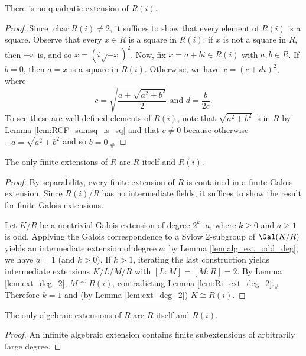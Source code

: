 \begin{lemma}
  \label{lem:Ri_ext_deg_2}
  \leanok
  There is no quadratic extension of $R(i)$.
\end{lemma}
\begin{proof}
  \leanok
  Since $\operatorname{char}R(i)\neq 2$, it suffices to show that every element of $R(i)$ is a square. Observe that every $x\in R$ is a square in $R(i)$: if $x$ is not a square in $R$, then $-x$ is, and so $x=(i\sqrt{-x})^2$. Now, fix $x=a+bi\in R(i)$ with $a,b\in R$. If $b=0$, then $a=x$ is a square in $R(i)$. Otherwise, we have $x=(c+di)^2$, where
  \[c=\sqrt{\frac{a+\sqrt{a^2+b^2}}{2}}\text{ and }d=\frac{b}{2c}.\]
  To see these are well-defined elements of $R(i)$, note that $\sqrt{a^2+b^2}$ is in $R$ by Lemma \ref{lem:RCF_sumsq_is_sq} and that $c\neq0$ because otherwise $-a=\sqrt{a^2+b^2}$ and so $b=0$.$_\#$
\end{proof}

\begin{theorem}
  \label{thm:FTAlg}
  \leanok
  The only finite extensions of $R$ are $R$ itself and $R(i)$.
\end{theorem}
\begin{proof}
  \leanok
  By separability, every finite extension of $R$ is contained in a finite Galois extension. Since $R(i)/R$ has no intermediate fields, it suffices to show the result for finite Galois extensions.
  
  Let $K/R$ be a nontrivial Galois extension of degree $2^k\cdot a$, where $k\geq 0$ and $a\geq1$ is odd. Applying the Galois correspondence to a Sylow 2-subgroup of $\Gal(K/R)$ yields an intermediate extension of degree $a$; by Lemma \ref{lem:alg_ext_odd_deg}, we have $a=1$ (and $k>0$). If $k>1$, iterating the last construction yields intermediate extensions $K/L/M/R$ with $[L:M]=[M:R]=2$. By Lemma \ref{lem:ext_deg_2}, $M\cong R(i)$, contradicting Lemma \ref{lem:Ri_ext_deg_2}.$_\#$ Therefore $k=1$ and (by Lemma \ref{lem:ext_deg_2}) $K\cong R(i)$.
\end{proof}

\begin{corollary}
  \label{cor:FTAlg_alg}
  \leanok
  The only algebraic extensions of $R$ are $R$ itself and $R(i)$.
\end{corollary}
\begin{proof}
  \leanok
  An infinite algebraic extension contains finite subextensions of arbitrarily large degree.
\end{proof}

